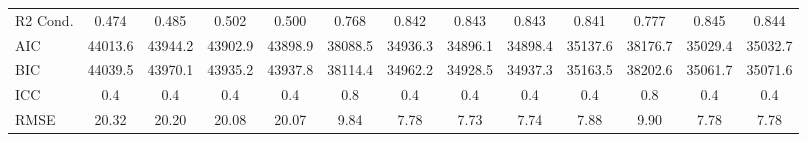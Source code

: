 \documentclass[]{report}
\begin{document}
\begin{landscape}
\begin{table}
{\begin{tabular}[t]{lcccccccccccc}
		R2 Cond. & \num{0.474} & \num{0.485} & \num{0.502} & \num{0.500} & \num{0.768} & \num{0.842} & \num{0.843} & \num{0.843} & \num{0.841} & \num{0.777} & \num{0.845} & \num{0.844}\\
		AIC & \num{44013.6} & \num{43944.2} & \num{43902.9} & \num{43898.9} & \num{38088.5} & \num{34936.3} & \num{34896.1} & \num{34898.4} & \num{35137.6} & \num{38176.7} & \num{35029.4} & \num{35032.7}\\
		BIC & \num{44039.5} & \num{43970.1} & \num{43935.2} & \num{43937.8} & \num{38114.4} & \num{34962.2} & \num{34928.5} & \num{34937.3} & \num{35163.5} & \num{38202.6} & \num{35061.7} & \num{35071.6}\\
		ICC & \num{0.4} & \num{0.4} & \num{0.4} & \num{0.4} & \num{0.8} & \num{0.4} & \num{0.4} & \num{0.4} & \num{0.4} & \num{0.8} & \num{0.4} & \num{0.4}\\
		RMSE & \num{20.32} & \num{20.20} & \num{20.08} & \num{20.07} & \num{9.84} & \num{7.78} & \num{7.73} & \num{7.74} & \num{7.88} & \num{9.90} & \num{7.78} & \num{7.78}\\
		\bottomrule
	\end{tabular}}
\end{table}



\end{landscape}
\end{document}
